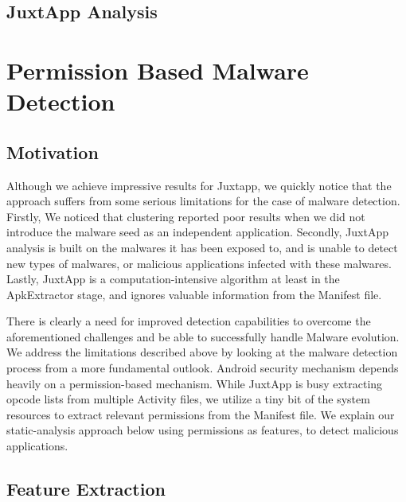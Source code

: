 \subsection{JuxtApp Analysis}

\section{Permission Based Malware Detection}

\subsection{Motivation}	\label{limitJuxtApp}

Although we achieve impressive results for Juxtapp, we quickly notice that the approach suffers from some serious limitations for the case of malware detection. Firstly, We noticed that clustering reported poor results when we did not introduce the malware seed as an independent application. Secondly, JuxtApp analysis is built on the malwares it has been exposed to, and is unable to detect new types of malwares, or malicious applications infected with these malwares. Lastly, JuxtApp is a computation-intensive algorithm at least in the ApkExtractor stage, and ignores valuable information from the Manifest file. 

There is clearly a need for improved detection capabilities to overcome the aforementioned challenges and be able to successfully handle Malware evolution. We address the limitations described above by looking at the malware detection process from a more fundamental outlook. Android security mechanism depends heavily on a permission-based mechanism. While JuxtApp is busy extracting opcode lists from multiple Activity files, we utilize a tiny bit of the system resources to extract relevant permissions from the Manifest file. We explain our static-analysis approach below using permissions as features, to detect malicious applications.

\subsection{Feature Extraction} \label{featureExtract}

